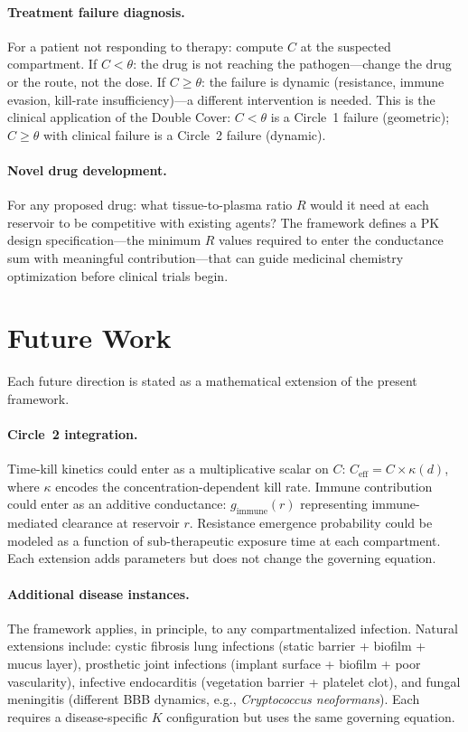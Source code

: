 \documentclass[11pt]{article}
\theoremstyle{plain}
\theoremstyle{definition}
\begin{document}
\paragraph{Treatment failure diagnosis.}
For a patient not responding to therapy: compute $C$ at the
suspected compartment. If $C < \theta$: the drug is not reaching
the pathogen---change the drug or the route, not the dose. If
$C \geq \theta$: the failure is dynamic (resistance, immune
evasion, kill-rate insufficiency)---a different intervention is
needed. This is the clinical application of the Double Cover:
$C < \theta$ is a Circle~1 failure (geometric); $C \geq \theta$
with clinical failure is a Circle~2 failure (dynamic).

\paragraph{Novel drug development.}
For any proposed drug: what tissue-to-plasma ratio $R$ would it
need at each reservoir to be competitive with existing agents? The
framework defines a PK design specification---the minimum $R$
values required to enter the conductance sum with meaningful
contribution---that can guide medicinal chemistry optimization
before clinical trials begin.

\section{Future Work}
\label{sec:future}

Each future direction is stated as a mathematical extension of the
present framework.

\paragraph{Circle~2 integration.}
Time-kill kinetics could enter as a multiplicative scalar on $C$:
$C_{\mathrm{eff}} = C \times \kappa(d)$, where $\kappa$ encodes
the concentration-dependent kill rate. Immune contribution could
enter as an additive conductance: $g_{\mathrm{immune}}(r)$
representing immune-mediated clearance at reservoir $r$. Resistance
emergence probability could be modeled as a function of
sub-therapeutic exposure time at each compartment. Each extension
adds parameters but does not change the governing equation.

\paragraph{Additional disease instances.}
The framework applies, in principle, to any compartmentalized
infection. Natural extensions include: cystic fibrosis lung
infections (static barrier + biofilm + mucus layer), prosthetic
joint infections (implant surface + biofilm + poor vascularity),
infective endocarditis (vegetation barrier + platelet clot), and
fungal meningitis (different BBB dynamics, e.g., \emph{Cryptococcus
neoformans}). Each requires a disease-specific $K$ configuration
but uses the same governing equation.
\end{document}
